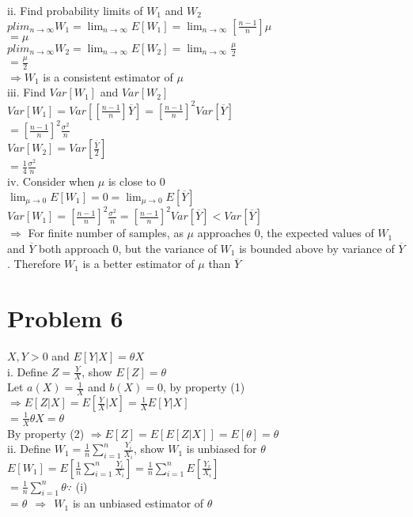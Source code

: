\documentclass[11pt, oneside]{article}   	%
\begin{document}
ii. Find probability limits of $W_1$ and $W_2$\\
$plim_{n\rightarrow \infty}W_1=\lim_{n\rightarrow\infty}E[W_1]=\lim_{n\rightarrow\infty}[\frac{n-1}{n}]\mu$\\
\indent$=\mu$\\
$plim_{n\rightarrow \infty}W_2=\lim_{n\rightarrow\infty}E[W_2]=\lim_{n\rightarrow\infty}\frac{\mu}{2}$\\
\indent$=\frac{\mu}{2}$\\
\indent$\Rightarrow W_1$ is a consistent estimator of $\mu$\\

iii. Find $Var[W_1]$ and $Var[W_2]$\\
$Var[W_1]=Var[[\frac{n-1}{n}]\overline{Y}]=[\frac{n-1}{n}]^2Var[\overline{Y}]$\\
\indent$=[\frac{n-1}{n}]^2\frac{\sigma^2}{n}$\\
$Var[W_2]=Var[\frac{\overline{Y}}{2}]$\\
\indent$=\frac{1}{4}\frac{\sigma^2}{n}$\\

iv. Consider when $\mu$ is close to 0\\
\indent$\lim_{\mu\rightarrow 0}E[W_1]=0=\lim_{\mu\rightarrow 0} E[\overline{Y}]$\\
\indent$Var[W_1]=[\frac{n-1}{n}]^2\frac{\sigma^2}{n}=[\frac{n-1}{n}]^2 Var[\overline{Y}]<Var[\overline{Y}]$\\
$\Rightarrow$ For finite number of samples, as $\mu$ approaches 0, the expected values of $W_1$ and $\overline{Y}$ both approach 0, but the variance of $W_1$ is bounded above by variance of $\overline{Y}$. Therefore $W_1$ is a better estimator of $\mu$ than $\overline{Y}$

\section{Problem 6}
$X,Y>0$ and $E[Y|X]=\theta X$\\

i. Define $Z=\frac{Y}{X}$, show $E[Z]=\theta$\\
Let $a(X)=\frac{1}{X}$ and $b(X)=0$, by property (1) $\Rightarrow E[Z|X]=E[\frac{Y}{X}|X]=\frac{1}{X}E[Y|X]$\\
\indent$=\frac{1}{X} \theta X=\theta$\\
\indent By property (2) $\Rightarrow E[Z]=E[E[Z|X]]=E[\theta]=\theta$\\

ii. Define $W_1=\frac{1}{n}\sum_{i=1}^{n}\frac{Y_i}{X_i}$, show $W_1$ is unbiased for $\theta$\\
$E[W_1]=E[\frac{1}{n}\sum_{i=1}^{n}\frac{Y_i}{X_i}]=\frac{1}{n}\sum_{i=1}^{n}E[\frac{Y_i}{X_i}]$\\
\indent$=\frac{1}{n}\sum_{i=1}^{n}\theta$\hfil$\because$ (i)\\
\indent$=\theta\ \ \Rightarrow\ \ W_1$ is an unbiased estimator of $\theta$\\
\end{document}
